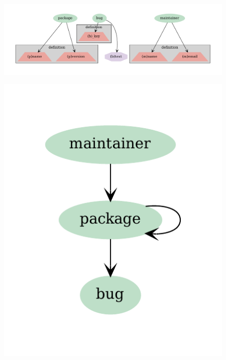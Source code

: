 \documentclass[10pt,oneside,a4paper, twocolumn]{article}
\begin{document}
    \begin{strip}
        \centering
        \begin{subfigure}[t]{0.75\textwidth}
            \centering
            \includegraphics[width=\textwidth]{../figs/debian-eco-vc2fields}
        \end{subfigure}%
        \hfill
        \begin{subfigure}[t]{0.23\textwidth}
            \centering
            \includegraphics[width=\textwidth]{../figs/debian-eco-vc2vc}
        \end{subfigure}

        \label{fig:schema}
    \end{strip}
\end{document}
